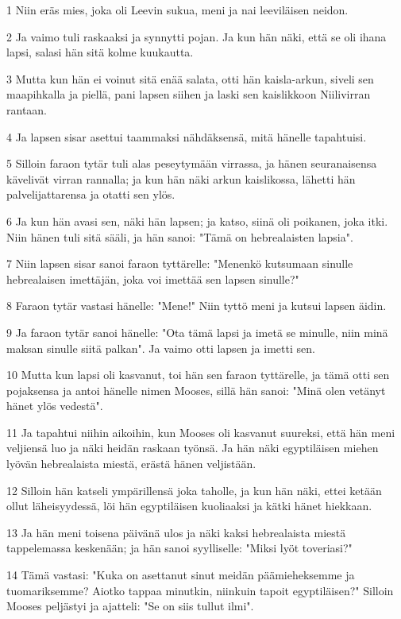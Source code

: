 \par 1 Niin eräs mies, joka oli Leevin sukua, meni ja nai leeviläisen neidon.
\par 2 Ja vaimo tuli raskaaksi ja synnytti pojan. Ja kun hän näki, että se oli ihana lapsi, salasi hän sitä kolme kuukautta.
\par 3 Mutta kun hän ei voinut sitä enää salata, otti hän kaisla-arkun, siveli sen maapihkalla ja piellä, pani lapsen siihen ja laski sen kaislikkoon Niilivirran rantaan.
\par 4 Ja lapsen sisar asettui taammaksi nähdäksensä, mitä hänelle tapahtuisi.
\par 5 Silloin faraon tytär tuli alas peseytymään virrassa, ja hänen seuranaisensa kävelivät virran rannalla; ja kun hän näki arkun kaislikossa, lähetti hän palvelijattarensa ja otatti sen ylös.
\par 6 Ja kun hän avasi sen, näki hän lapsen; ja katso, siinä oli poikanen, joka itki. Niin hänen tuli sitä sääli, ja hän sanoi: "Tämä on hebrealaisten lapsia".
\par 7 Niin lapsen sisar sanoi faraon tyttärelle: "Menenkö kutsumaan sinulle hebrealaisen imettäjän, joka voi imettää sen lapsen sinulle?"
\par 8 Faraon tytär vastasi hänelle: "Mene!" Niin tyttö meni ja kutsui lapsen äidin.
\par 9 Ja faraon tytär sanoi hänelle: "Ota tämä lapsi ja imetä se minulle, niin minä maksan sinulle siitä palkan". Ja vaimo otti lapsen ja imetti sen.
\par 10 Mutta kun lapsi oli kasvanut, toi hän sen faraon tyttärelle, ja tämä otti sen pojaksensa ja antoi hänelle nimen Mooses, sillä hän sanoi: "Minä olen vetänyt hänet ylös vedestä".
\par 11 Ja tapahtui niihin aikoihin, kun Mooses oli kasvanut suureksi, että hän meni veljiensä luo ja näki heidän raskaan työnsä. Ja hän näki egyptiläisen miehen lyövän hebrealaista miestä, erästä hänen veljistään.
\par 12 Silloin hän katseli ympärillensä joka taholle, ja kun hän näki, ettei ketään ollut läheisyydessä, löi hän egyptiläisen kuoliaaksi ja kätki hänet hiekkaan.
\par 13 Ja hän meni toisena päivänä ulos ja näki kaksi hebrealaista miestä tappelemassa keskenään; ja hän sanoi syylliselle: "Miksi lyöt toveriasi?"
\par 14 Tämä vastasi: "Kuka on asettanut sinut meidän päämieheksemme ja tuomariksemme? Aiotko tappaa minutkin, niinkuin tapoit egyptiläisen?" Silloin Mooses peljästyi ja ajatteli: "Se on siis tullut ilmi".
